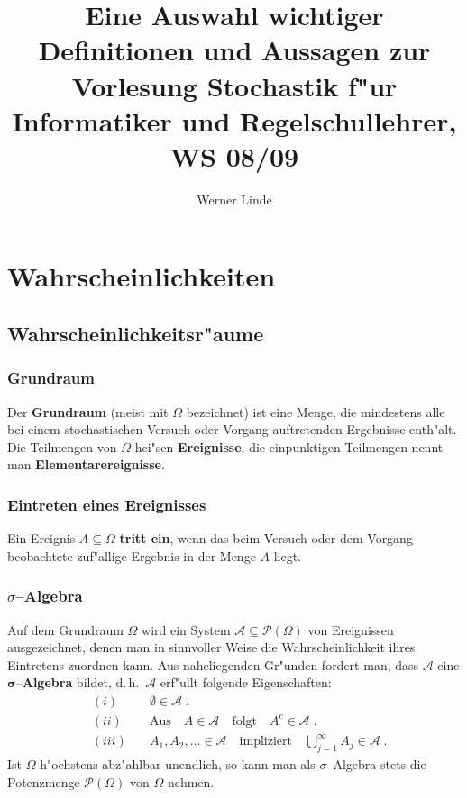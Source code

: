 
%
\renewcommand{\labelenumi}{\arabic{enumi}.}
\renewcommand{\labelenumii}{\arabic{enumi}.\arabic{enumii}}
\renewcommand{\fr}{\mathcal}
\newtheorem{thm}{Satz}[section]


\title{Eine Auswahl wichtiger Definitionen und Aussagen
 zur Vorlesung
\glqq{}Stochastik f"ur Informatiker und Regelschullehrer\grqq{}, WS 08/09}

\author{Werner Linde}
\maketitle

\section{Wahrscheinlichkeiten}
\subsection{Wahrscheinlichkeitsr"aume}

\subsubsection{Grundraum}
Der \textbf{Grundraum} (meist mit $\Omega$ bezeichnet) ist eine Menge,
die mindestens alle bei einem stochastischen Versuch oder Vorgang
auftretenden Ergebnisse enth"alt. Die Teilmengen von $\Omega$ hei"sen \textbf{Ereignisse},
die einpunktigen Teilmengen nennt man \textbf{Elementarereignisse}.

\subsubsection{Eintreten eines Ereignisses}
Ein Ereignis $A\subseteq \Omega$ \textbf{tritt ein}, wenn das beim Versuch oder dem Vorgang
beobachtete zuf"allige Ergebnis in der Menge
$A$ liegt.

\subsubsection{$\sigma$--Algebra}
Auf dem Grundraum $\Omega$ wird ein System $\fr A\subseteq \fr P(\Omega)$  von Ereignissen
ausgezeichnet, denen man in sinnvoller Weise die
Wahrscheinlichkeit ihres Eintretens zuordnen kann. Aus naheliegenden Gr"unden fordert man,
dass $\fr A$ eine $\mathbf \sigma$--\textbf{Algebra} bildet, d.\,h.~$\fr A$ erf"ullt
folgende Eigenschaften$\colon$
\begin{eqnarray*}
&(i)&\quad\emptyset\in\fr A\;.\\
&(ii)&\quad\mbox{Aus}\quad A\in\fr A\quad\mbox{folgt}\quad A^c\in \fr A\;.\\
&(iii)&\quad
A_1,A_2,\ldots\in \fr A \quad \mbox{impliziert}\quad \bigcup_{j=1}^\infty A_j\in\fr A\;.
\end{eqnarray*}
Ist $\Omega$ h"ochstens abz"ahlbar unendlich, so kann man als $\sigma$--Algebra stets die
Potenzmenge $\fr P(\Omega)$ von $\Omega$ nehmen.
